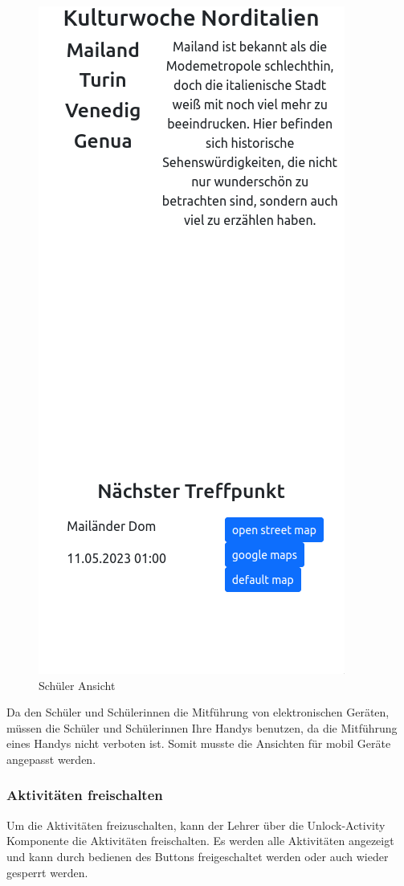 \begin{figure}[h]
    \centering
    \includegraphics[scale=0.8]{pics/overview.png}
    \caption{Schüler Ansicht}
    \label{lst:Overview}
\end{figure}

\newpage

Da den Schüler und Schülerinnen die Mitführung von elektronischen Geräten, müssen die Schüler und Schülerinnen Ihre Handys benutzen, da die Mitführung eines Handys nicht verboten ist. Somit musste die Ansichten für mobil Geräte angepasst werden. 

\subsubsection{Aktivitäten freischalten}
Um die Aktivitäten freizuschalten, kann der Lehrer über die Unlock-Activity Komponente die Aktivitäten freischalten. Es werden alle Aktivitäten angezeigt und kann durch bedienen des Buttons freigeschaltet werden oder auch wieder gesperrt werden.

